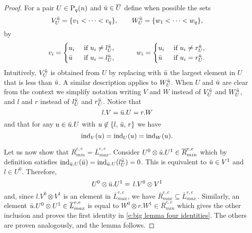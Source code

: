 \begin{proof}
	For a pair $U \in \P_q(n)$ and $\bu \in \overline{U}$ define when possible the sets 
	\begin{equation*}
	V^\bu_U = \{v_1 < \cdots < v_q\}, \qquad W_U^\bu = \{w_1 < \cdots < w_q\},
	\end{equation*}
	by
	\begin{align*}
	v_i = 
	\begin{cases}
	u_i & \text{ if } u_i \neq l_U^\bu, \\
	\bu	& \text{ if } u_i = l_U^\bu,
	\end{cases}
	\qquad \quad
	w_i = 
	\begin{cases}
	u_i & \text{ if } u_i \neq r_U^\bu, \\
	\bu	& \text{ if } u_i = r_U^\bu.
	\end{cases}
	\end{align*}
	Intuitively, $V_U^\bu$ is obtained from $U$ by replacing with $\bu$ the largest element in $U$ that is less than $\bu$.
	A similar description applies to $W_U^\bu$.
	When $U$ and $\bu$ are clear from the context we simplify notation writing $V$ and $W$ instead of $V^\bu_U$ and $W^\bu_U$, and $l$ and $r$ instead of $l_U^\bu$ and $r_U^\bu$.
	Notice that
	\begin{equation*}
	l.V = \bu.U = r.W
	\end{equation*}
	and that for any $u \in \bu.U$ with $u \not \in \{l,\, \bu,\, r\}$ we have
	\begin{equation*}
	\ind_{V}(u) = \ind_{U}(u) = \ind_{W}(u).
	\end{equation*}
	
	Let us now show that $\overline{R}_{min}^{e,e} = \overline{L}_{max}^{e,e}$.
	Consider $U^0 \otimes \bu.U^1 \in \overline{R}_{min}^{e, e}$ which by definition satisfies $\ind_{\bu.U}(\bu) = \ind_{\bu.U}(l_{U}^\bu) = 0$.
	This is equivalent to $\bu \in V^1$ and $l \in U^0$.
	Therefore, 
	\begin{equation*}
	U^0 \otimes \bu.U^1 = \, l.V^0 \otimes V^1
	\end{equation*}
	and, since $l.V^0 \otimes V^1$ is an element in $\overline{L}_{max}^{e,e}$, we have $\overline{R}_{max}^{e,e} \subseteq \overline{L}_{max}^{e,e}$\,.
	Similarly, an element $\bu.U^0 \otimes U^1 \in \overline{L}_{max}^{e,e}$ is equal to $W^0 \otimes r.W^1 \in \overline{R}_{min}^{e,e}$ which gives the other inclusion and proves the first identity in \eqref{e:big lemma four identities}.
	The others are proven analogously, and the lemma follows.
\end{proof}

